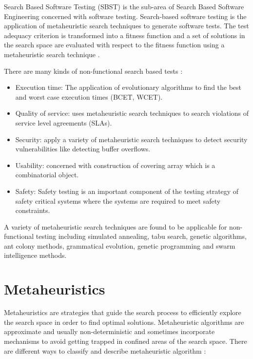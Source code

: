 \documentclass{report}
\begin{document}
Search Based Software Testing (SBST) is the sub-area of Search Based Software Engineering concerned with software testing. Search-based software testing is the application of metaheuristic search techniques to generate software tests. The test adequacy criterion is transformed into a fitness function and a set of solutions in the search space are evaluated with respect to the fitness function using a metaheuristic search technique \cite{Afzal2009a} \cite{Aleti2016} \cite{Harman2015}.

There are many kinds of non-functional search based tests  \cite{Afzal2009a}:

\begin{itemize}
\item Execution time: The application of evolutionary algorithms to find the best and worst case execution times (BCET, WCET).
\item Quality of service: uses metaheuristic search techniques to search violations of service level agreements (SLAs).
\item Security: apply a variety of metaheuristic search techniques  to detect security vulnerabilities like detecting buffer overflows.
\item Usability: concerned with construction of covering array which is a combinatorial object.
\item Safety: Safety testing is an important component of the testing strategy of safety critical systems where the systems are required to meet safety constraints.
\end{itemize}

A variety of metaheuristic search techniques are found to be applicable for non-functional testing including simulated annealing, tabu search, genetic algorithms, ant colony methods, grammatical evolution, genetic programming and swarm intelligence methods.


\section{Metaheuristics}

Metaheuristics are strategies that guide the search process to efficiently explore the search space in order to find optimal solutions. Metaheuristic algorithms are approximate and usually non-deterministic and sometimes incorporate mechanisms to avoid getting trapped in confined areas of the search space. There are different ways to classify and describe metaheuristic algorithm \cite{Blum2003}:
\end{document}
